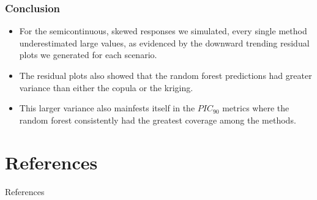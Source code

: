 \documentclass{beamer}
\begin{document}
\begin{frame}
	\frametitle{Conclusion}
	\begin{itemize}
	\item For the semicontinuous, skewed responses we simulated, every single method underestimated large values, as evidenced by the downward trending residual plots we generated for each scenario.
	\item The residual plots also showed that the random forest predictions had greater variance than either the copula or the kriging.
	\item This larger variance also mainfests itself in the $PIC_{90}$ metrics where the random forest consistently had the greatest coverage among the methods.
	\end{itemize}
\end{frame}

\section{References}
\begin{frame}{References}
\printbibliography
\end{frame}
\end{document}
